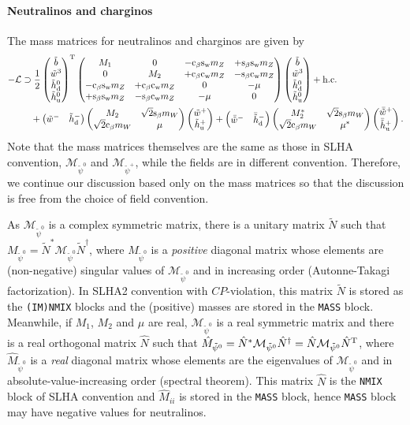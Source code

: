 \documentclass[CheatSheet]{subfiles}
\begin{document}
\paragraph{Neutralinos and charginos}
The mass matrices for neutralinos and charginos are given by
\begin{equation}
\begin{split}
  -\mathcal L&\supset
 \frac12\pmat{\tib\\\tiw^3\\\thdz\\\thuz}^\TT
 \pmat{
 M_1&0&-\co\beta\sw m_Z&+\si\beta\sw m_Z \\
 0&M_2&+\co\beta\cw m_Z&-\si\beta\cw m_Z \\
 -\co\beta\sw m_Z&+\co\beta\cw m_Z&0&-\mu \\
 +\si\beta\sw m_Z&-\si\beta\cw m_Z&-\mu&0
 }
 \pmat{\tib\\\tiw^3\\\thdz\\\thuz} + \text{h.c.}
\\&\quad
+\pmat{\tiw^- & \thdm}
\pmat{ M_2& \sqrt2\si\beta m_W\\ \sqrt2\co\beta m_W& \mu}
\pmat{\tiw^+ \\ \thup}
+\pmat{\bar{\tiw}^- & \bthdm}
\pmat{ M_2^*& \sqrt2\si\beta m_W\\ \sqrt2\co\beta m_W& \mu^*}
\pmat{\bar{\tiw}^+ \\ \bthup}.
\end{split}
\end{equation}
Note that the mass matrices themselves are the same as those in SLHA convention, $\mathcal M_{\tilde\psi^0}$ and $\mathcal M_{\tilde\psi^+}$, while the fields are in different convention.
Therefore, we continue our discussion based only on the mass matrices so that the discussion is free from the choice of field convention.

As $\mathcal M_{\tilde\psi^0}$ is a complex symmetric matrix, there is a unitary matrix $\tilde N$ such that
$M_{\tilde\psi^0}=\tilde N^* \mathcal M_{\tilde\psi^0}\tilde N^\dagger$, where $M_{\tilde\psi^0}$ is a \emph{positive} diagonal matrix whose elements are (non-negative) singular values of $\mathcal M_{\tilde\psi^0}$ and in increasing order (Autonne-Takagi factorization).
In SLHA2 convention with $CP$-violation, this matrix $\tilde N$ is stored as the \texttt{(IM)NMIX} blocks and the (positive) masses are stored in the \texttt{MASS} block.
Meanwhile, if $M_1$, $M_2$ and $\mu$ are real, $\mathcal M_{\tilde\psi^0}$ is a real symmetric matrix and there is a real orthogonal matrix $\hat N$ such that
$\hat M_{\tilde\psi^0}=\hat N^* \mathcal M_{\tilde\psi^0}\hat N^\dagger=\hat N \mathcal M_{\tilde\psi^0}\hat N^{\mathrm{T}}$, where $\hat M_{\tilde\psi^0}$ is a \emph{real} diagonal matrix whose elements are the eigenvalues of $\mathcal M_{\tilde\psi^0}$ and in absolute-value-increasing order (spectral theorem).
This matrix $\hat N$ is the \texttt{NMIX} block of SLHA convention and $\hat M_{ii}$ is stored in the \texttt{MASS} block, hence \texttt{MASS} block may have negative values for neutralinos.
\end{document}
